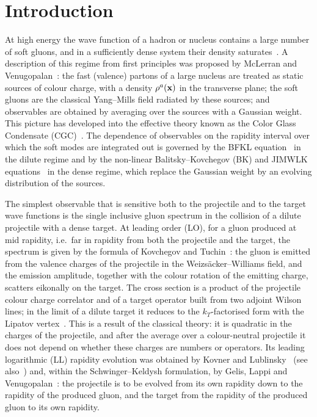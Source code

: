 \section{Introduction}\label{sec:intro}

At high energy the wave function of a hadron or nucleus contains a large number of soft gluons, and in a sufficiently dense system their density saturates~\cite{Gribov:1983ivg,Mueller:1985wy}. A description of this regime from first principles was proposed by McLerran and Venugopalan~\cite{McLerran:1993ni,McLerran:1993ka}: the fast (valence) partons of a large nucleus are treated as static sources of colour charge, with a density $\rho^a(\mathbf{x})$ in the transverse plane; the soft gluons are the classical Yang--Mills field radiated by these sources; and observables are obtained by averaging over the sources with a Gaussian weight. This picture has developed into the effective theory known as the Color Glass Condensate (CGC)~\cite{Iancu:2003xm,Weigert:2005us,Gelis:2010nm,Kovchegov:2012mbw}. The dependence of observables on the rapidity interval over which the soft modes are integrated out is governed by the BFKL equation~\cite{Kuraev:1977fs,Balitsky:1978ic} in the dilute regime and by the non-linear Balitsky--Kovchegov (BK) and JIMWLK equations~\cite{Balitsky:1995ub,Kovchegov:1999yj,Kovchegov:1999ua,Jalilian-Marian:1997qno,Jalilian-Marian:1997jx,Jalilian-Marian:1997ubg,Kovner:2000pt,Weigert:2000gi,Iancu:2000hn,Iancu:2001ad,Ferreiro:2001qy} in the dense regime, which replace the Gaussian weight by an evolving distribution of the sources.

The simplest observable that is sensitive both to the projectile and to the target wave functions is the single inclusive gluon spectrum in the collision of a dilute projectile with a dense target. At leading order (LO), for a gluon produced at mid rapidity, i.e.\ far in rapidity from both the projectile and the target, the spectrum is given by the formula of Kovchegov and Tuchin~\cite{Kovchegov:2001sc,Kovchegov:1998bi}: the gluon is emitted from the valence charges of the projectile in the Weizs\"acker--Williams field, and the emission amplitude, together with the colour rotation of the emitting charge, scatters eikonally on the target. The cross section is a product of the projectile colour charge correlator and of a target operator built from two adjoint Wilson lines; in the limit of a dilute target it reduces to the $k_T$-factorised form with the Lipatov vertex~\cite{Gribov:1983ivg,Kharzeev:2003wz,Blaizot:2004wu}. This is a result of the classical theory: it is quadratic in the charges of the projectile, and after the average over a colour-neutral projectile it does not depend on whether these charges are numbers or operators. Its leading logarithmic (LL) rapidity evolution was obtained by Kovner and Lublinsky~\cite{Kovner:2006wr} (see also~\cite{Kovner:2006ge}) and, within the Schwinger--Keldysh formulation, by Gelis, Lappi and Venugopalan~\cite{Gelis:2008rw}: the projectile is to be evolved from its own rapidity down to the rapidity of the produced gluon, and the target from the rapidity of the produced gluon to its own rapidity.

